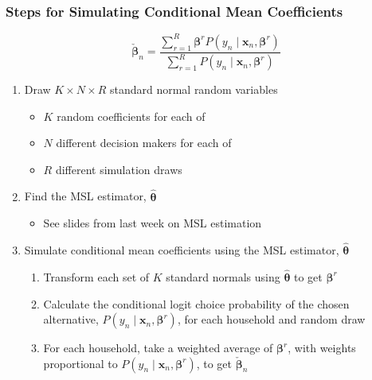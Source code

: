 \documentclass{beamer}\usepackage[]{graphicx}\usepackage[]{xcolor}
\begin{document}
\begin{frame}\frametitle{Steps for Simulating Conditional Mean Coefficients}
    $$\check{\bm{\beta}}_n = \frac{\sum_{r = 1}^R \bm{\beta}^r P(y_n \mid \bm{x}_n, \bm{\beta}^r)}{\sum_{r = 1}^R P(y_n \mid \bm{x}_n, \bm{\beta}^r)}$$
    \begin{enumerate}
        \item Draw $K \times N \times R$ standard normal random variables
        \begin{itemize}
            \item $K$ random coefficients for each of
            \item $N$ different decision makers for each of
            \item $R$ different simulation draws
        \end{itemize}
        \item Find the MSL estimator, $\widehat{\bm{\theta}}$
        \begin{itemize}
            \item See slides from last week on MSL estimation
        \end{itemize}
        \item Simulate conditional mean coefficients using the MSL estimator, $\widehat{\bm{\theta}}$
        \begin{enumerate}
            \item Transform each set of $K$ standard normals using $\widehat{\bm{\theta}}$ to get $\bm{\beta}^r$
            \item Calculate the conditional logit choice probability of the chosen alternative, $P(y_n \mid \bm{x}_n, \bm{\beta}^r)$, for each household and random draw
            \item For each household, take a weighted average of $\bm{\beta}^r$, with weights proportional to $P(y_n \mid \bm{x}_n, \bm{\beta}^r)$, to get $\check{\bm{\beta}}_n$
        \end{enumerate}
    \end{enumerate}
\end{frame}
\end{document}
